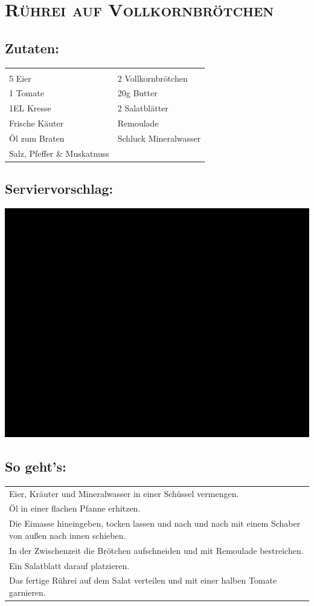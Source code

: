 \section{\textsc{Rührei auf Vollkornbrötchen}}

\subsection*{Zutaten:}

\begin{tabular}{p{7.5cm} p{7.5cm}}
	& \\
	5 Eier & 2 Vollkornbrötchen \\
	1 Tomate & 20g Butter \\
  1EL Kresse & 2 Salatblätter \\
  Frische Käuter & Remoulade \\
  Öl zum Braten & Schluck Mineralwasser \\
  Salz, Pfeffer \& Muskatnuss
\end{tabular}

\subsection*{Serviervorschlag:}

\includegraphics[width=\textwidth]{img/ph.jpg}

\subsection*{So geht's:}

\begin{tabular}{p{15cm}}
	\\
  Eier, Kräuter und Mineralwasser in einer Schüssel vermengen.\\
  Öl in einer flachen Pfanne erhitzen.\\
  Die Eimasse hineingeben, tocken lassen und nach und nach mit einem Schaber von außen nach innen schieben.\\
  In der Zwischenzeit die Brötchen aufschneiden und mit Remoulade bestreichen.\\
  Ein Salatblatt darauf platzieren.\\
  Das fertige Rührei auf dem Salat verteilen und mit einer halben Tomate garnieren.
\end{tabular}
